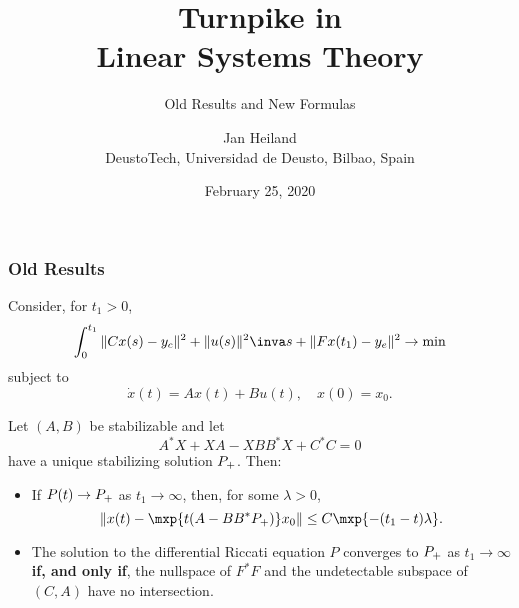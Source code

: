\documentclass[xcolor=dvipsnames,10pt,hyperref={breaklinks=true}]{beamer}
\title{Turnpike in \\ Linear Systems Theory}
\subtitle{Old Results and New Formulas}
\date{\small{\jobname}}
\author{Jan Heiland \\ \scriptsize DeustoTech, Universidad de Deusto, Bilbao, Spain}
\date{February 25, 2020}
\begin{document}
	
\begin{frame}[plain]
\maketitle
\end{frame}


\begin{frame}[b]
\frametitle{Old Results}
Consider, for $t_1>0$,
\begin{equation*}
  \int_{0}^{t_1} \|Cx(s)-y_c\|^2+ \|u(s)\|^2\inva s + \|F x(t_1)-y_e\|^2
  \to \min
\end{equation*}
subject to
\begin{equation*}
  \dot x(t) = Ax(t) + Bu(t), \quad x(0)=x_0.
\end{equation*}

\begin{theorem}[Callier/Winkin/Willems'94 with $y_c=0$ and $y_e=0$]
  Let $(A,B)$ be stabilizable and let
  \begin{equation}
    A^*X+XA-XBB^*X+C^*C=0 \tag{ARE}
  \end{equation}
  have a unique stabilizing solution $P_+$. Then:
  \begin{itemize}
    \item If $P(t) \to P_+$ as $t_1\to \infty$, then, for some $\lambda>0$,
      \begin{equation*}
        \|x(t) - \mxp{t(A-BB^*\PP)}x_0\| \leq C\mxp{-(t_1-t)\lambda}.
      \end{equation*}
    \item The solution to the differential Riccati equation $P$ converges to
      $P_+$ as $t_1\to \infty$ \textbf{if, and only if}, the nullspace of $F^*F$ and the
      undetectable subspace of $(C,A)$ have no intersection.
  \end{itemize}
\end{theorem}

\end{frame}
\end{document}
